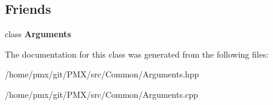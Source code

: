 \subsection*{Friends}
\begin{DoxyCompactItemize}
\item 
\mbox{\label{classArguments_1_1Option_acbd2a21b98cd2cb694fd02340724b625}} 
class {\bfseries Arguments}
\end{DoxyCompactItemize}


The documentation for this class was generated from the following files\+:\begin{DoxyCompactItemize}
\item 
/home/pmx/git/\+P\+M\+X/src/\+Common/Arguments.\+hpp\item 
/home/pmx/git/\+P\+M\+X/src/\+Common/Arguments.\+cpp\end{DoxyCompactItemize}

